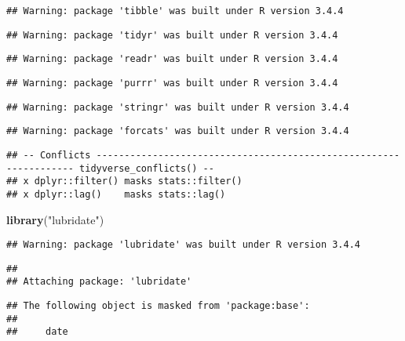 \documentclass[]{article}
\newenvironment{Shaded}{\begin{snugshade}}{\end{snugshade}}
\newcommand{\KeywordTok}[1]{\textcolor[rgb]{0.13,0.29,0.53}{\textbf{#1}}}
\newcommand{\StringTok}[1]{\textcolor[rgb]{0.31,0.60,0.02}{#1}}
\newcommand{\NormalTok}[1]{#1}
\begin{document}
\begin{verbatim}
## Warning: package 'tibble' was built under R version 3.4.4
\end{verbatim}

\begin{verbatim}
## Warning: package 'tidyr' was built under R version 3.4.4
\end{verbatim}

\begin{verbatim}
## Warning: package 'readr' was built under R version 3.4.4
\end{verbatim}

\begin{verbatim}
## Warning: package 'purrr' was built under R version 3.4.4
\end{verbatim}

\begin{verbatim}
## Warning: package 'stringr' was built under R version 3.4.4
\end{verbatim}

\begin{verbatim}
## Warning: package 'forcats' was built under R version 3.4.4
\end{verbatim}

\begin{verbatim}
## -- Conflicts ------------------------------------------------------------------ tidyverse_conflicts() --
## x dplyr::filter() masks stats::filter()
## x dplyr::lag()    masks stats::lag()
\end{verbatim}

\begin{Shaded}
\begin{Highlighting}[]
\KeywordTok{library}\NormalTok{(}\StringTok{"lubridate"}\NormalTok{)}
\end{Highlighting}
\end{Shaded}

\begin{verbatim}
## Warning: package 'lubridate' was built under R version 3.4.4
\end{verbatim}

\begin{verbatim}
## 
## Attaching package: 'lubridate'
\end{verbatim}

\begin{verbatim}
## The following object is masked from 'package:base':
## 
##     date
\end{verbatim}
\end{document}
